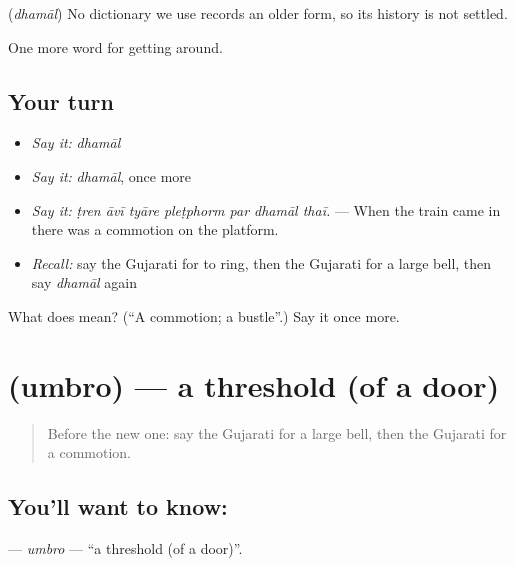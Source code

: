 \begin{cousinweb}
\textbf{} (\emph{dhamāl}) No dictionary we use records an older form, so its history is not settled.
\end{cousinweb}

\begin{grammarlens}[title={What you've built}]
One more word for getting around.
\end{grammarlens}

\subsection*{Your turn}
\begin{itemize}
\raggedright
  \item \emph{Say it:} \emph{dhamāl}
  \item \emph{Say it:} \emph{dhamāl}, once more
  \item \emph{Say it:} \emph{ṭren āvī tyāre pleṭphorm par dhamāl thaī.} — When the train came in there was a commotion on the platform.
  \item \emph{Recall:} say the Gujarati for to ring, then the Gujarati for a large bell, then say \emph{dhamāl} again
\end{itemize}

\begin{tcolorbox}[breakable,colback=teal!4,colframe=teal!35!black,title={Before you move on}]
What does  mean? (\textquotedblleft{}A commotion; a bustle\textquotedblright{}.) Say it once more.
\end{tcolorbox}
\section[\texorpdfstring{\gu{ઉંબરો} (umbro)}{ઉંબરો (umbro)}]{ (umbro) — a threshold (of a door)}

\label{lesson:GU-C397-umbro}



\begin{quote}
Before the new one: say the Gujarati for a large bell, then the Gujarati for a commotion.
\end{quote}

\subsection*{You'll want to know: }
\textbf{} — \emph{umbro} — \textquotedblleft{}a threshold (of a door)\textquotedblright{}.

